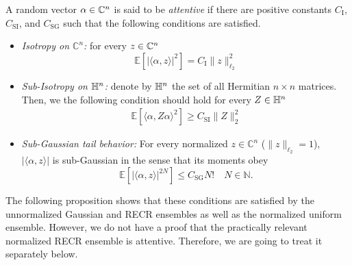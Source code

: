 \begin{definition}%
  \label{def:pl.attentive}
  A random vector $\alpha \in {\mathbb{C}}^n$ is said to be \emph{attentive} if there are positive constants $C_\mathrm{I}$, $C_\mathrm{SI}$, and $C_\mathrm{SG}$ such that the following conditions are satisfied.
  \begin{itemize}
    \item \emph{Isotropy on $\mathbb{C}^n$:} for every $z \in {\mathbb{C}}^n$
    \[
      \mathbb{E} \left[ | \langle \alpha,  z \rangle |^2 \right] = C_\mathrm{I} \|  z \|_{\ell_2}^2
      \label{eq:pl.tight_frame}
    \]

    \item \emph{Sub-Isotropy on $\mathbb{H}^n$:} denote by $\mathbb{H}^n$ the set of all Hermitian $n \times n$ matrices.
      Then, we the following condition should hold for every $Z \in \mathbb{H}^n$
    \begin{align}
      \mathbb{E} \left[ \langle \alpha,  Z \alpha \rangle^2 \right] \geq C_\mathrm{SI} \|  Z \|_2^2 \label{eq:pl.sub_isotropy}
    \end{align}

    \item \emph{Sub-Gaussian tail behavior:} For every normalized $ z \in \mathbb{C}^n$ ($\|  z \|_{\ell_2}=1$), $| \langle \alpha,  z \rangle|$ is sub-Gaussian in the sense that its moments obey
    \[
      \mathbb{E} \left[ | \langle \alpha,  z \rangle|^{2N} \right] \leq C_\mathrm{SG} N! \quad N \in \mathbb{N}.
    \label{eq:pl.subexponential}
    \]
  \end{itemize}
\end{definition}

The following proposition shows that these conditions are satisfied by the unnormalized Gaussian and RECR ensembles as well as the normalized uniform ensemble.
However, we do not have a proof that the practically relevant normalized RECR ensemble is attentive.
Therefore, we are going to treat it separately below.

